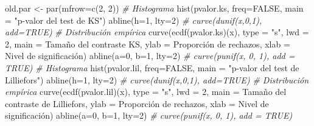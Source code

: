 \documentclass[
]{book}
\newenvironment{Shaded}{\begin{snugshade}}{\end{snugshade}}
\newcommand{\AttributeTok}[1]{\textcolor[rgb]{0.77,0.63,0.00}{#1}}
\newcommand{\CommentTok}[1]{\textcolor[rgb]{0.56,0.35,0.01}{\textit{#1}}}
\newcommand{\ConstantTok}[1]{\textcolor[rgb]{0.00,0.00,0.00}{#1}}
\newcommand{\DecValTok}[1]{\textcolor[rgb]{0.00,0.00,0.81}{#1}}
\newcommand{\FunctionTok}[1]{\textcolor[rgb]{0.00,0.00,0.00}{#1}}
\newcommand{\NormalTok}[1]{#1}
\newcommand{\OtherTok}[1]{\textcolor[rgb]{0.56,0.35,0.01}{#1}}
\newcommand{\StringTok}[1]{\textcolor[rgb]{0.31,0.60,0.02}{#1}}
\theoremstyle{break}
\theoremstyle{definition}
\theoremstyle{definition}
\theoremstyle{definition}
\theoremstyle{definition}
\theoremstyle{remark}
\begin{document}
\begin{Shaded}
\begin{Highlighting}[]
\NormalTok{old.par }\OtherTok{\textless{}{-}} \FunctionTok{par}\NormalTok{(}\AttributeTok{mfrow=}\FunctionTok{c}\NormalTok{(}\DecValTok{2}\NormalTok{, }\DecValTok{2}\NormalTok{))}
\CommentTok{\# Histograma}
\FunctionTok{hist}\NormalTok{(pvalor.ks, }\AttributeTok{freq=}\ConstantTok{FALSE}\NormalTok{, }\AttributeTok{main =} \StringTok{"p{-}valor del test de KS"}\NormalTok{)}
\FunctionTok{abline}\NormalTok{(}\AttributeTok{h=}\DecValTok{1}\NormalTok{, }\AttributeTok{lty=}\DecValTok{2}\NormalTok{)   }\CommentTok{\# curve(dunif(x,0,1), add=TRUE)}
\CommentTok{\# Distribución empírica}
\FunctionTok{curve}\NormalTok{(}\FunctionTok{ecdf}\NormalTok{(pvalor.ks)(x), }\AttributeTok{type =} \StringTok{"s"}\NormalTok{, }\AttributeTok{lwd =} \DecValTok{2}\NormalTok{, }
      \AttributeTok{main =} \StringTok{\textquotesingle{}Tamaño del contraste KS\textquotesingle{}}\NormalTok{, }\AttributeTok{ylab =} \StringTok{\textquotesingle{}Proporción de rechazos\textquotesingle{}}\NormalTok{, }
      \AttributeTok{xlab =} \StringTok{\textquotesingle{}Nivel de significación\textquotesingle{}}\NormalTok{)}
\FunctionTok{abline}\NormalTok{(}\AttributeTok{a=}\DecValTok{0}\NormalTok{, }\AttributeTok{b=}\DecValTok{1}\NormalTok{, }\AttributeTok{lty=}\DecValTok{2}\NormalTok{)   }\CommentTok{\# curve(punif(x, 0, 1), add = TRUE)}
\CommentTok{\# Histograma}
\FunctionTok{hist}\NormalTok{(pvalor.lil, }\AttributeTok{freq=}\ConstantTok{FALSE}\NormalTok{, }\AttributeTok{main =} \StringTok{"p{-}valor del test de Lilliefors"}\NormalTok{)}
\FunctionTok{abline}\NormalTok{(}\AttributeTok{h=}\DecValTok{1}\NormalTok{, }\AttributeTok{lty=}\DecValTok{2}\NormalTok{)   }\CommentTok{\# curve(dunif(x,0,1), add=TRUE)}
\CommentTok{\# Distribución empírica}
\FunctionTok{curve}\NormalTok{(}\FunctionTok{ecdf}\NormalTok{(pvalor.lil)(x), }\AttributeTok{type =} \StringTok{"s"}\NormalTok{, }\AttributeTok{lwd =} \DecValTok{2}\NormalTok{, }
      \AttributeTok{main =} \StringTok{\textquotesingle{}Tamaño del contraste de Lilliefors\textquotesingle{}}\NormalTok{, }\AttributeTok{ylab =} \StringTok{\textquotesingle{}Proporción de rechazos\textquotesingle{}}\NormalTok{, }
      \AttributeTok{xlab =} \StringTok{\textquotesingle{}Nivel de significación\textquotesingle{}}\NormalTok{)}
\FunctionTok{abline}\NormalTok{(}\AttributeTok{a=}\DecValTok{0}\NormalTok{, }\AttributeTok{b=}\DecValTok{1}\NormalTok{, }\AttributeTok{lty=}\DecValTok{2}\NormalTok{)   }\CommentTok{\# curve(punif(x, 0, 1), add = TRUE)}
\end{Highlighting}
\end{Shaded}
\end{document}
